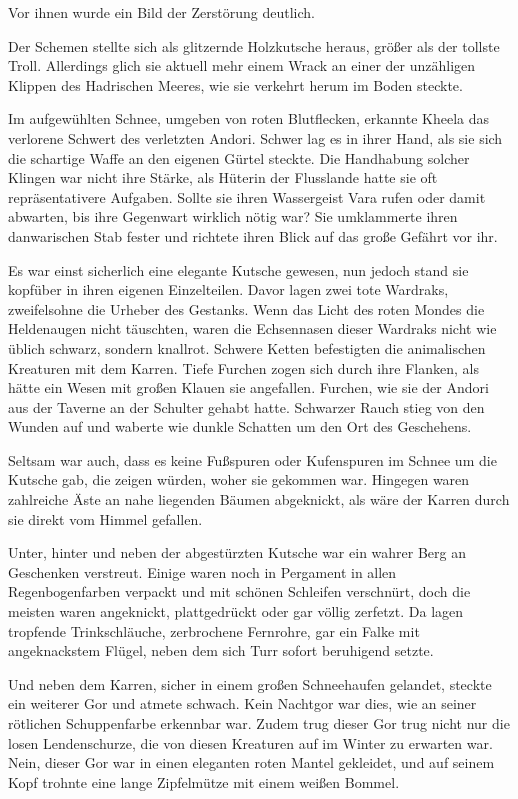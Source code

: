 \documentclass[10pt, a4paper, oneside]{book}
\begin{document}
Vor ihnen wurde ein Bild der Zerstörung deutlich.

Der Schemen stellte sich als glitzernde Holzkutsche heraus, größer als der tollste Troll. Allerdings glich sie aktuell mehr einem Wrack an einer der unzähligen Klippen des Hadrischen Meeres, wie sie verkehrt herum im Boden steckte.

Im aufgewühlten Schnee, umgeben von roten Blutflecken, erkannte Kheela das verlorene Schwert des verletzten Andori. Schwer lag es in ihrer Hand, als sie sich die schartige Waffe an den eigenen Gürtel steckte. Die Handhabung solcher Klingen war nicht ihre Stärke, als Hüterin der Flusslande hatte sie oft repräsentativere Aufgaben. Sollte sie ihren Wassergeist Vara rufen oder damit abwarten, bis ihre Gegenwart wirklich nötig war? Sie umklammerte ihren danwarischen Stab fester und richtete ihren Blick auf das große Gefährt vor ihr.

Es war einst sicherlich eine elegante Kutsche gewesen, nun jedoch stand sie kopfüber in ihren eigenen Einzelteilen. Davor lagen zwei tote Wardraks, zweifelsohne die Urheber des Gestanks. Wenn das Licht des roten Mondes die Heldenaugen nicht täuschten, waren die Echsennasen dieser Wardraks nicht wie üblich schwarz, sondern knallrot. Schwere Ketten befestigten die animalischen Kreaturen mit dem Karren. Tiefe Furchen zogen sich durch ihre Flanken, als hätte ein Wesen mit großen Klauen sie angefallen. Furchen, wie sie der Andori aus der Taverne an der Schulter gehabt hatte. Schwarzer Rauch stieg von den Wunden auf und waberte wie dunkle Schatten um den Ort des Geschehens.

Seltsam war auch, dass es keine Fußspuren oder Kufenspuren im Schnee um die Kutsche gab, die zeigen würden, woher sie gekommen war. Hingegen waren zahlreiche Äste an nahe liegenden Bäumen abgeknickt, als wäre der Karren durch sie direkt vom Himmel gefallen.

Unter, hinter und neben der abgestürzten Kutsche war ein wahrer Berg an Geschenken verstreut. Einige waren noch in Pergament in allen Regenbogenfarben verpackt und mit schönen Schleifen verschnürt, doch die meisten waren angeknickt, plattgedrückt oder gar völlig zerfetzt. Da lagen tropfende Trinkschläuche, zerbrochene Fernrohre, gar ein Falke mit angeknackstem Flügel, neben dem sich Turr sofort beruhigend setzte.

Und neben dem Karren, sicher in einem großen Schneehaufen gelandet, steckte ein weiterer Gor und atmete schwach. Kein Nachtgor war dies, wie an seiner rötlichen Schuppenfarbe erkennbar war. Zudem trug dieser Gor trug nicht nur die losen Lendenschurze, die von diesen Kreaturen auf im Winter zu erwarten war. Nein, dieser Gor war in einen eleganten roten Mantel gekleidet, und auf seinem Kopf trohnte eine lange Zipfelmütze mit einem weißen Bommel.
\end{document}
